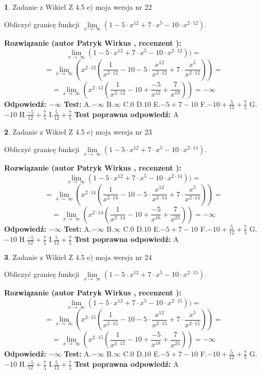 \documentclass[12pt, a4paper]{article}
\theoremstyle{definition} %
\newtheorem{zad}{}
\newcommand{\zadStart}[1]{\begin{zad}#1\newline}
\newcommand{\zadStop}{\end{zad}}
\newcommand{\rozwStart}[2]{\noindent \textbf{Rozwiązanie (autor #1 , recenzent #2): }\newline}
\newcommand{\rozwStop}{\newline}
\newcommand{\odpStart}{\noindent \textbf{Odpowiedź:}\newline}
\newcommand{\odpStop}{\newline}
\newcommand{\testStart}{\noindent \textbf{Test:}\newline}
\newcommand{\testStop}{\newline}
\newcommand{\kluczStart}{\noindent \textbf{Test poprawna odpowiedź:}\newline}
\newcommand{\kluczStop}{\newline}
\begin{document}
\zadStart{Zadanie z Wikieł Z 4.5 e) moja wersja nr 22}



Obliczyć granicę funkcji  $\lim\limits_{x\to\ \infty}(1 - 5 \cdot x^{12}+7 \cdot x^{5}- 10 \cdot x^{2\cdot12})$.
\zadStop
\rozwStart{Patryk Wirkus}{}
$$\lim\limits_{x\to\ \infty}(1 - 5 \cdot x^{12}+7 \cdot x^{5}- 10 \cdot x^{2\cdot12}))=$$
$$=\lim\limits_{x\to\ \infty}(x^{2\cdot12}(\frac{1}{x^{2\cdot12}}-10 -5 \cdot \frac{x^{12}}{x^{2\cdot12}}+7 \cdot \frac{x^{5}}{x^{2\cdot12}}))=$$
$$=\lim\limits_{x\to\ \infty}(x^{2\cdot12}(\frac{1}{x^{2\cdot12}}-10 + \frac{-5}{x^{12}}+ \frac{7}{x^{19}}))=-\infty$$
\rozwStop
\odpStart
$-\infty$
\odpStop
\testStart
A.$-\infty$ B.$\infty$ C.$0$ D.$10$ E.$-5 + 7 - 10$
F.$-10+\frac{5}{12}+\frac{7}{5}$ G.$-10$
H.$\frac{-5}{12}+\frac{7}{5}$
I.$\frac{5}{12}+\frac{7}{5}$
\testStop
\kluczStart
A
\kluczStop



\zadStart{Zadanie z Wikieł Z 4.5 e) moja wersja nr 23}



Obliczyć granicę funkcji  $\lim\limits_{x\to\ \infty}(1 - 5 \cdot x^{12}+7 \cdot x^{5}- 10 \cdot x^{2\cdot14})$.
\zadStop
\rozwStart{Patryk Wirkus}{}
$$\lim\limits_{x\to\ \infty}(1 - 5 \cdot x^{12}+7 \cdot x^{5}- 10 \cdot x^{2\cdot14}))=$$
$$=\lim\limits_{x\to\ \infty}(x^{2\cdot14}(\frac{1}{x^{2\cdot14}}-10 -5 \cdot \frac{x^{12}}{x^{2\cdot14}}+7 \cdot \frac{x^{5}}{x^{2\cdot14}}))=$$
$$=\lim\limits_{x\to\ \infty}(x^{2\cdot14}(\frac{1}{x^{2\cdot14}}-10 + \frac{-5}{x^{16}}+ \frac{7}{x^{23}}))=-\infty$$
\rozwStop
\odpStart
$-\infty$
\odpStop
\testStart
A.$-\infty$ B.$\infty$ C.$0$ D.$10$ E.$-5 + 7 - 10$
F.$-10+\frac{5}{12}+\frac{7}{5}$ G.$-10$
H.$\frac{-5}{12}+\frac{7}{5}$
I.$\frac{5}{12}+\frac{7}{5}$
\testStop
\kluczStart
A
\kluczStop



\zadStart{Zadanie z Wikieł Z 4.5 e) moja wersja nr 24}



Obliczyć granicę funkcji  $\lim\limits_{x\to\ \infty}(1 - 5 \cdot x^{12}+7 \cdot x^{5}- 10 \cdot x^{2\cdot15})$.
\zadStop
\rozwStart{Patryk Wirkus}{}
$$\lim\limits_{x\to\ \infty}(1 - 5 \cdot x^{12}+7 \cdot x^{5}- 10 \cdot x^{2\cdot15}))=$$
$$=\lim\limits_{x\to\ \infty}(x^{2\cdot15}(\frac{1}{x^{2\cdot15}}-10 -5 \cdot \frac{x^{12}}{x^{2\cdot15}}+7 \cdot \frac{x^{5}}{x^{2\cdot15}}))=$$
$$=\lim\limits_{x\to\ \infty}(x^{2\cdot15}(\frac{1}{x^{2\cdot15}}-10 + \frac{-5}{x^{18}}+ \frac{7}{x^{25}}))=-\infty$$
\rozwStop
\odpStart
$-\infty$
\odpStop
\testStart
A.$-\infty$ B.$\infty$ C.$0$ D.$10$ E.$-5 + 7 - 10$
F.$-10+\frac{5}{12}+\frac{7}{5}$ G.$-10$
H.$\frac{-5}{12}+\frac{7}{5}$
I.$\frac{5}{12}+\frac{7}{5}$
\testStop
\kluczStart
A
\kluczStop
\end{document}
